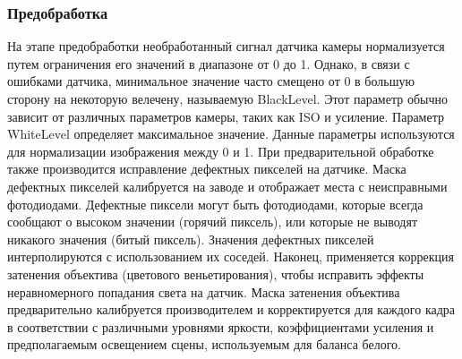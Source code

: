 \subsubsection{Предобработка}

На этапе предобработки необработанный сигнал датчика камеры нормализуется путем ограничения его значений в диапазоне от 0 до 1. Однако, в связи с ошибками датчика, минимальное значение часто смещено от 0 в большую сторону на некоторую велечену, называемую BlackLevel. Этот параметр обычно зависит от различных параметров камеры, таких как ISO и усиление. Параметр WhiteLevel определяет максимальное значение. Данные параметры используются для нормализации изображения между 0 и 1. При предварительной обработке также производится исправление дефектных пикселей на датчике. Маска дефектных пикселей калибруется на заводе и отображает места с неисправными фотодиодами. Дефектные пиксели могут быть фотодиодами, которые всегда сообщают о высоком значении (горячий пиксель), или которые не выводят никакого значения (битый пиксель). Значения дефектных пикселей интерполируются с использованием их соседей. Наконец, применяется коррекция затенения объектива (цветового веньетирования), чтобы исправить эффекты неравномерного попадания света на датчик. Маска затенения объектива предварительно калибруется производителем и корректируется для каждого кадра в соответствии с различными уровнями яркости, коэффициентами усиления и предполагаемым освещением сцены, используемым для баланса белого.